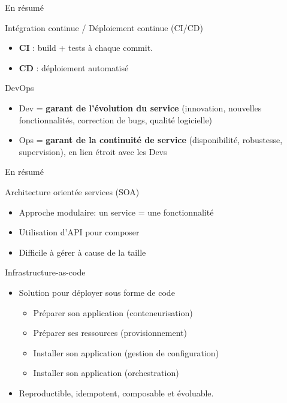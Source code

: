 \documentclass[aspectratio=169,10pt]{beamer}
\begin{document}
\begin{frame}{En résumé}

\begin{alertblock}{Intégration continue / Déploiement continue (CI/CD)}
  \begin{itemize}
        \item \textbf{CI} : build + tests à chaque commit.
      \item \textbf{CD} : déploiement automatisé 
  \end{itemize}
\end{alertblock}

\begin{alertblock}{DevOps}
  \begin{itemize}
    \item Dev = \textbf{garant de l’évolution du service} (innovation, nouvelles fonctionnalités, correction de bugs, qualité logicielle)
    \item Ops = \textbf{garant de la continuité de service} (disponibilité, robustesse, supervision), en lien étroit avec les Devs
  \end{itemize}
\end{alertblock}


\end{frame}


\begin{frame}{En résumé}

\begin{alertblock}{Architecture orientée services (SOA)}
  \begin{itemize}
    \item Approche modulaire: un service = une fonctionnalité
    \item Utilisation d'API pour composer
    \item Difficile à gérer à cause de la taille
  \end{itemize}
\end{alertblock}

\begin{alertblock}{Infrastructure-as-code}
  \begin{itemize}
    \item Solution pour déployer sous forme de code
    \begin{itemize}
        \item Préparer son application (conteneurisation)
        \item Préparer ses ressources (provisionnement)
        \item Installer son application (gestion de configuration)
        \item Installer son application (orchestration)
    \end{itemize}
    \item Reproductible, idempotent, composable et évoluable.
  \end{itemize}
\end{alertblock}

\end{frame}
\end{document}

